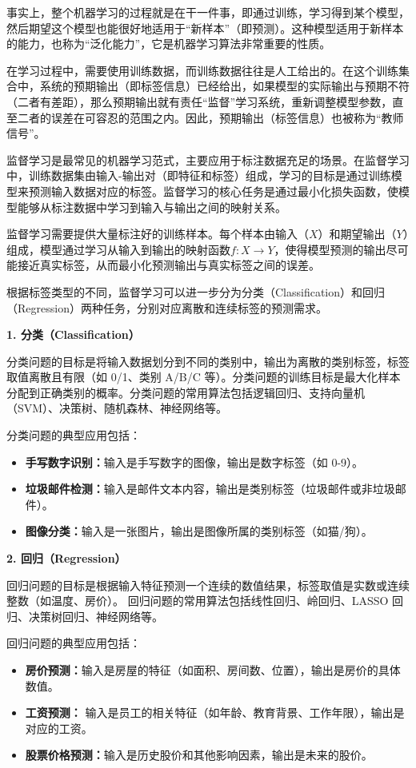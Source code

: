 事实上，整个机器学习的过程就是在干一件事，即通过训练，学习得到某个模型，然后期望这个模型也能很好地适用于“新样本”（即预测）。这种模型适用于新样本的能力，也称为“泛化能力”，它是机器学习算法非常重要的性质。

在学习过程中，需要使用训练数据，而训练数据往往是人工给出的。在这个训练集合中，系统的预期输出（即标签信息）已经给出，如果模型的实际输出与预期不符（二者有差距），那么预期输出就有责任“监督”学习系统，重新调整模型参数，直至二者的误差在可容忍的范围之内。因此，预期输出（标签信息）也被称为“教师信号”。



监督学习是最常见的机器学习范式，主要应用于标注数据充足的场景。在监督学习中，训练数据集由输入-输出对（即特征和标签）组成，学习的目标是通过训练模型来预测输入数据对应的标签。监督学习的核心任务是通过最小化损失函数，使模型能够从标注数据中学习到输入与输出之间的映射关系。

监督学习需要提供大量标注好的训练样本。每个样本由输入（$X$）和期望输出（$Y$）组成，模型通过学习从输入到输出的映射函数$f: X \rightarrow Y$，使得模型预测的输出尽可能接近真实标签，从而最小化预测输出与真实标签之间的误差。

根据标签类型的不同，监督学习可以进一步分为分类（Classification）和回归（Regression）两种任务，分别对应离散和连续标签的预测需求。

{\bf  1. 分类（Classification）}

分类问题的目标是将输入数据划分到不同的类别中，输出为离散的类别标签，标签取值离散且有限（如 0/1、类别 A/B/C 等）。分类问题的训练目标是最大化样本分配到正确类别的概率。分类问题的常用算法包括逻辑回归、支持向量机（SVM）、决策树、随机森林、神经网络等。

分类问题的典型应用包括：
\begin{itemize}
\item {\bf 手写数字识别：}输入是手写数字的图像，输出是数字标签（如 0-9）。
 \item {\bf  垃圾邮件检测：}输入是邮件文本内容，输出是类别标签（垃圾邮件或非垃圾邮件）。
\item {\bf  图像分类：}输入是一张图片，输出是图像所属的类别标签（如猫/狗）。
\end{itemize}



 {\bf  2. 回归（Regression）}
 
 回归问题的目标是根据输入特征预测一个连续的数值结果，标签取值是实数或连续整数（如温度、房价）。
回归问题的常用算法包括线性回归、岭回归、LASSO 回归、决策树回归、神经网络等。

回归问题的典型应用包括：
\begin{itemize}
 \item {\bf 房价预测：}输入是房屋的特征（如面积、房间数、位置），输出是房价的具体数值。
\item {\bf  工资预测：} 输入是员工的相关特征（如年龄、教育背景、工作年限），输出是对应的工资。
 \item {\bf 股票价格预测：}输入是历史股价和其他影响因素，输出是未来的股价。
\end{itemize}

